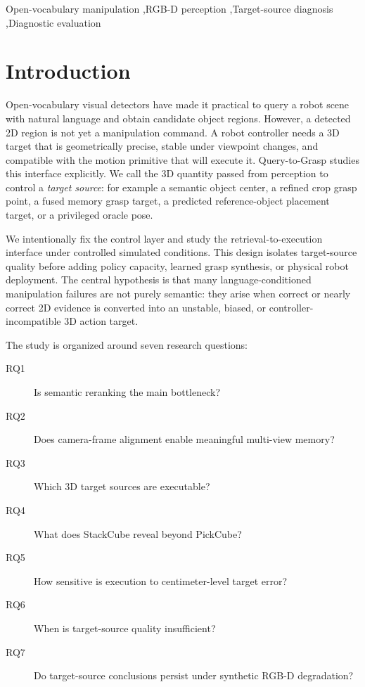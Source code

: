 \documentclass[preprint,12pt]{elsarticle}
\begin{document}
\begin{frontmatter}
\begin{keyword}
Open-vocabulary manipulation \sep RGB-D perception \sep Target-source diagnosis
\sep Diagnostic evaluation
\end{keyword}

\end{frontmatter}

\section{Introduction}

Open-vocabulary visual detectors have made it practical to query a robot scene
with natural language and obtain candidate object regions. However, a detected
2D region is not yet a manipulation command. A robot controller needs a 3D
target that is geometrically precise, stable under viewpoint changes, and
compatible with the motion primitive that will execute it. Query-to-Grasp
studies this interface explicitly. We call the 3D quantity passed from
perception to control a \emph{target source}: for example a semantic object
center, a refined crop grasp point, a fused memory grasp target, a predicted
reference-object placement target, or a privileged oracle pose.

We intentionally fix the control layer and study the retrieval-to-execution
interface under controlled simulated conditions. This design isolates
target-source quality before adding policy capacity, learned grasp synthesis,
or physical robot deployment. The central hypothesis is that many
language-conditioned manipulation failures are not purely semantic: they arise
when correct or nearly correct 2D evidence is converted into an unstable,
biased, or controller-incompatible 3D action target.

The study is organized around seven research questions:

\begin{description}
\item[RQ1] Is semantic reranking the main bottleneck?
\item[RQ2] Does camera-frame alignment enable meaningful multi-view memory?
\item[RQ3] Which 3D target sources are executable?
\item[RQ4] What does StackCube reveal beyond PickCube?
\item[RQ5] How sensitive is execution to centimeter-level target error?
\item[RQ6] When is target-source quality insufficient?
\item[RQ7] Do target-source conclusions persist under synthetic RGB-D degradation?
\end{description}
\end{document}
